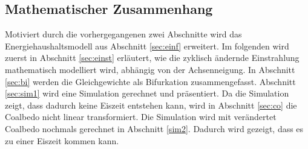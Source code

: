 \begin{refsection}
\section{Mathematischer Zusammenhang}\label{sec:math}
Motiviert durch die vorhergegangenen zwei Abschnitte wird das
Energiehaushaltsmodell aus Abschnitt \ref{sec:einf} erweitert. Im
folgenden wird zuerst in Abschnitt \ref{sec:einst} erläutert, wie
die zyklisch ändernde Einstrahlung mathematisch modelliert wird,
abhängig von der Achsenneigung. In Abschnitt \ref{sec:bi} werden
die Gleichgewichte als Bifurkation zusammengefasst. Abschnitt
\ref{sec:sim1} wird eine Simulation gerechnet und präsentiert. Da
die Simulation zeigt, dass dadurch keine Eiszeit entstehen kann,
wird in Abschnitt \ref{sec:co} die Coalbedo nicht linear transformiert.
Die Simulation wird mit verändertet Coalbedo nochmals gerechnet in
Abschnitt \ref{sim2}. Dadurch wird gezeigt, dass es zu einer Eiszeit
kommen kann.



\end{refsection}
